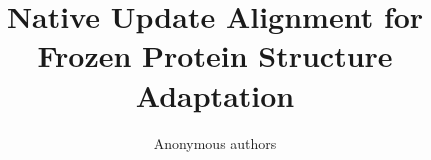 \documentclass{article}
\title{Native Update Alignment for Frozen Protein Structure Adaptation}
\author{Anonymous authors}
\begin{document}
\maketitle
\begin{abstract}

\end{abstract}







\label{maintextend}
\clearpage



\clearpage
\appendix

\end{document}
